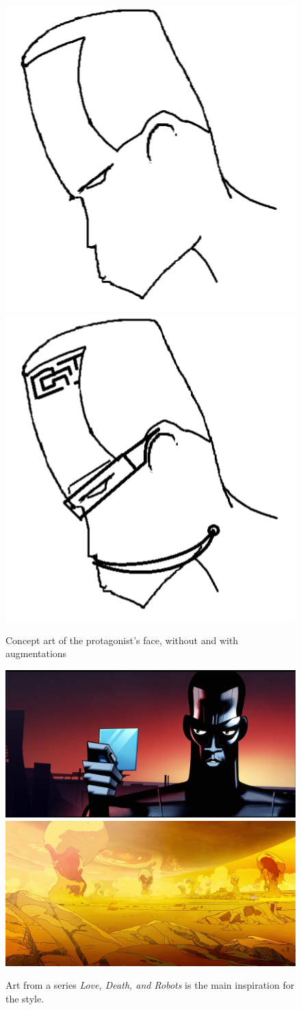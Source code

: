 \documentclass[a4paper,10pt,english]{article}
\begin{document}
\begin{figure}[h]
    \centering
    \includegraphics[width=0.25\linewidth]{StrandedAndAugmentedProtagonist.png}
    \includegraphics[width=0.25\linewidth]{StrandedAndAugmentedProtagonistAugmented.png}
    \caption{Concept art of the protagonist's face, without and with augmentations}
\end{figure}

\begin{figure}[h]
    \centering
    \includegraphics[width=0.6\linewidth]{LoveDeathAndRobotsZima.jpg}
    \includegraphics[width=0.6\linewidth]{LoveDeathAndRobotsTVPOTM.jpg}
    \caption[]{Art from a series \emph{Love, Death, and Robots} is the main inspiration for the style.\footnotemark}
\end{figure}

\end{document}
